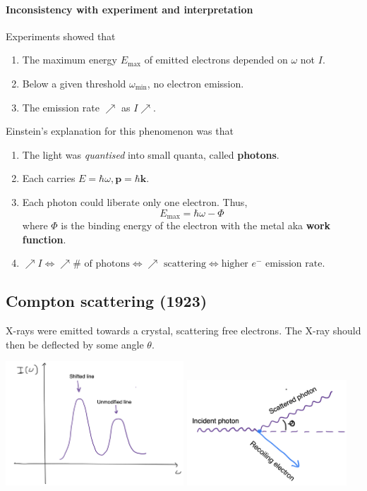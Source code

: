 \documentclass[a4paper]{article}
\begin{document}
\paragraph{Inconsistency with experiment and interpretation}
Experiments showed that
\begin{enumerate}
	\item The maximum energy \( E_{\max} \) of emitted electrons depended on \( \omega \) not $I$. 
	\item Below a given threshold \( \omega_{\min} \), no electron emission.
	\item The emission rate $ \nearrow $ as $ I \nearrow $.
\end{enumerate}
Einstein's explanation for this phenomenon was that 
\begin{enumerate}
    \item The light was \textit{quantised} into small quanta, called \textbf{photons}.
    \item Each carries \( E = \hbar \omega, \mathbf{p}= \hbar \mathbf{k} \).
    \item Each photon could liberate only one electron.
    Thus,
    \[
        E_{\max} = \hbar \omega - \Phi
    \]
    where \( \Phi \) is the binding energy of the electron with the metal aka \textbf{work function}.
    \item $ \nearrow I \Leftrightarrow \nearrow \# \text{ of photons}\Leftrightarrow \nearrow \text{ scattering}\Leftrightarrow \text{higher }e^- \text{ emission rate}$.
\end{enumerate}

\subsection{Compton scattering (1923)}

X-rays were emitted towards a crystal, scattering free electrons.
The X-ray should then be deflected by some angle \( \theta \).

\begin{center}
    \includegraphics[width=0.5\textwidth]{qm3.png}
    \includegraphics[width=0.45\textwidth]{qm4.png}
\end{center}
\end{document}
